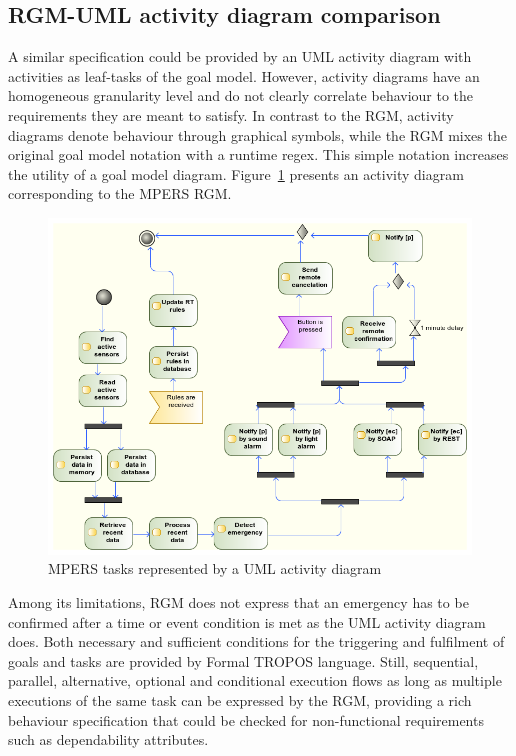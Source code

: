 \subsection{RGM-UML activity diagram comparison}

A similar specification could be provided by an UML activity diagram with activities as leaf-tasks of the goal model. However, activity diagrams have an homogeneous granularity level and do not clearly correlate behaviour to the requirements they are meant to satisfy. In contrast to the RGM, activity diagrams denote behaviour through graphical symbols, while the RGM mixes the original goal model notation with a runtime regex. This simple notation increases the utility of a goal model diagram. Figure~\ref{fig:MPERS_UMLAD} presents an activity diagram corresponding to the MPERS RGM. 

\begin{figure}[h!]
\centering
\includegraphics[width=1\textwidth]{imgs/MPERS_UMLAD.png}
\caption{MPERS tasks represented by a UML activity diagram}
\label{fig:MPERS_UMLAD}
\end{figure}

Among its limitations, RGM does not express that an emergency has to be confirmed after a time or event condition is met as the UML activity diagram does. Both necessary and sufficient conditions for the triggering and fulfilment of goals and tasks are provided by Formal TROPOS language.  Still, sequential, parallel, alternative, optional and conditional execution flows as long as multiple executions of the same task can be expressed by the RGM, providing a rich behaviour specification that could be checked for non-functional requirements such as dependability attributes.

